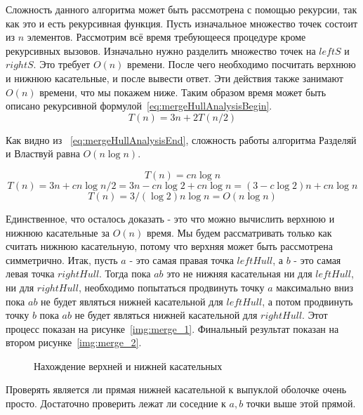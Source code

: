 Сложность данного алгоритма может быть рассмотрена с помощью рекурсии, так как это и есть рекурсивная функция. Пусть изначальное множество точек состоит из $n$ элементов. Рассмотрим всё время требующееся процедуре кроме рекурсивных вызовов. Изначально нужно разделить множество точек на $leftS$ и $rightS$. Это требует $O(n)$ времени. После чего необходимо посчитать верхнюю и нижнюю касательные, и после вывести ответ. Эти действия также занимают $O(n)$ времени, что мы покажем ниже. Таким образом время может быть описано рекурсивной формулой~\ref{eq:mergeHullAnalysisBegin}.
\begin{equation}\label{eq:mergeHullAnalysisBegin}
T(n) = 3n + 2T(n/2)
\end{equation}

Как видно из ~\ref{eq:mergeHullAnalysisEnd}, сложность работы алгоритма Разделяй и Властвуй равна $O(n \log n)$.

\[
T(n) = cn \log n
\]
\[
T(n) = 3n + cn \log n/2 = 3n - cn \log 2 + cn \log n = (3 - c \log 2)n + cn \log n
\]
\begin{equation}\label{eq:mergeHullAnalysisEnd}
T(n) = 3/(\log 2)n \log n = O(n \log n)
\end{equation}

Единственное, что осталось доказать - это что можно вычислить верхнюю и нижнюю касательные за $O(n)$ время. Мы будем рассматривать только как считать нижнюю касательную, потому что верхняя может быть рассмотрена симметрично. Итак, пусть $a$ - это самая правая точка $leftHull$, а $b$ - это самая левая точка $rightHull$. Тогда пока $ab$ это не нижняя касательная ни для $leftHull$, ни для $rightHull$, необходимо попытаться продвинуть точку $a$ максимально вниз пока $ab$ не будет являться нижней касательной для $leftHull$, а потом продвинуть точку $b$ пока $ab$ не будет являться нижней касательной для $rightHull$. Этот процесс показан на рисунке~\ref{img:merge_1}. Финальный результат показан на втором рисунке~\ref{img:merge_2}.

\begin{figure}[H]
	{\centering
		\hfill
		\subbottom[\label{img:merge_1}]{%
			}
		\hfill
		\subbottom[\label{img:merge_2}]{%
			}
		\hfill
	}
	\caption{Нахождение верхней и нижней касательных}
	\label{img:merge}
\end{figure}


Проверять является ли прямая нижней касательной к выпуклой оболочке очень просто. Достаточно проверить лежат ли соседние к $a, b$ точки выше этой прямой.

